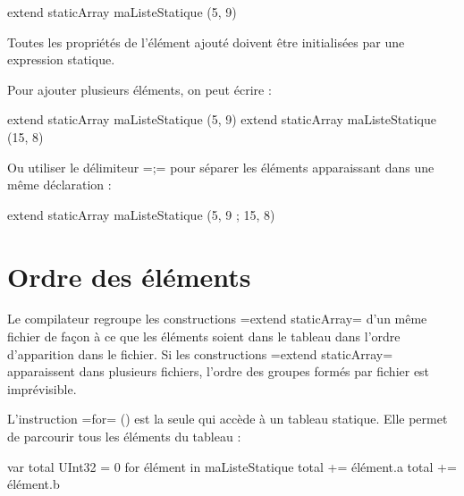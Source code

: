 \begin{OMNIBUS}
extend staticArray maListeStatique (5, 9)
\end{OMNIBUS}

Toutes les propriétés de l'élément ajouté doivent être initialisées par une expression statique.

Pour ajouter plusieurs éléments, on peut écrire :
\begin{OMNIBUS}
extend staticArray maListeStatique (5, 9)
extend staticArray maListeStatique (15, 8)
\end{OMNIBUS}

Ou utiliser le délimiteur \omnibus=;= pour séparer les éléments apparaissant dans une même déclaration :
\begin{OMNIBUS}
extend staticArray maListeStatique (5, 9 ; 15, 8)
\end{OMNIBUS}

\section{Ordre des éléments}

Le compilateur regroupe les constructions \omnibus=extend staticArray= d'un même fichier de façon à ce que les éléments soient dans le tableau dans l'ordre d'apparition dans le fichier. Si les constructions \omnibus=extend staticArray= apparaissent dans plusieurs fichiers, l'ordre des groupes formés par fichier est imprévisible.









L'instruction \omnibus=for= () est la seule qui accède à un tableau statique. Elle permet de parcourir tous les éléments du tableau :

\begin{OMNIBUS}
var total UInt32 = 0
for élément in maListeStatique {
  total += élément.a
  total += élément.b
}
\end{OMNIBUS}


